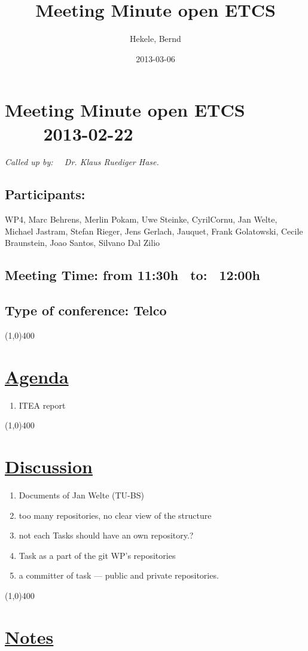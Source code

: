 \documentclass[a4paper]{article}
\title{Meeting Minute open ETCS}
\author{Hekele, Bernd}
\date{2013-03-06}
\begin{document}
\section*{\large{Meeting Minute open ETCS \ \ \ \ 2013-02-22}}

\large{\emph{Called up by: \ \  Dr. Klaus Ruediger Hase.}}

\subsection*{Participants:}WP4, Marc Behrens, Merlin Pokam, Uwe Steinke, CyrilCornu, Jan Welte, Michael Jastram, Stefan Rieger, Jens Gerlach, Jauquet, Frank Golatowski, Cecile Braunstein,  Joao Santos, Silvano Dal Zilio \\

\subsection*{Meeting Time: from 11:30h \ to: \ 12:00h}
\subsection*{Type of conference: Telco}

\line(1,0){400}
\section*{\underline{Agenda}}
\begin{enumerate}
\item  ITEA report

\end{enumerate}
\line(1,0){400}
\section*{\underline{Discussion}}

\begin{enumerate}
\item  Documents of Jan Welte (TU-BS)
\item  too many repositories, no clear view of the structure
\item  not each Tasks should have an own repository.?
\item Task as a part of the git WP's repositories
\item  a committer  of task --- public and private repositories.

\end{enumerate}

\line(1,0){400}
\section*{\underline{Notes}}
\end{document}
